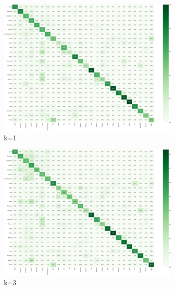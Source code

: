 \begin{figure}
    \centering
    \begin{subfigure}[b]{0.49\textwidth}
        \includegraphics[width=\textwidth]{assets/evaluation_results/ANN/confusion_matrix_k_1.png}
        \caption{k=1}
    \end{subfigure}
    \hfill
    \begin{subfigure}[b]{0.49\textwidth}
        \includegraphics[width=\textwidth]{assets/evaluation_results/ANN/confusion_matrix_k_3.png}
        \caption{k=3}
    \end{subfigure}
    \hfill
    \begin{subfigure}[b]{0.49\textwidth}

\end{subfigure}
\end{figure}
